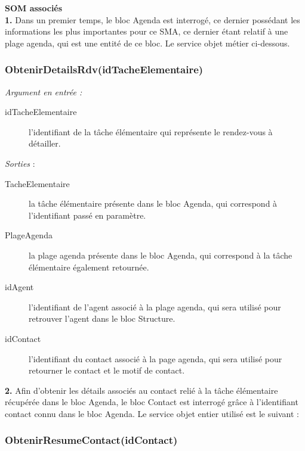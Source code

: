 \begin{shaded}
\textbf{SOM associés}\\
\textbf{1.} Dans un premier temps, le bloc Agenda est interrogé, ce dernier possédant les informations les plus importantes pour ce SMA, ce dernier étant relatif à une plage agenda, qui est une entité de ce bloc. Le service objet métier ci-dessous.
\end{shaded}


\subsubsection{ObtenirDetailsRdv(idTacheElementaire)}

\noindent \textit{Argument en entrée :}
\begin{description}
\item[idTacheElementaire] l'identifiant de la tâche élémentaire qui représente le rendez-vous à détailler. \\
\end{description}

\noindent \textit{Sorties} : 
\begin{description}
\item[TacheElementaire] la tâche élémentaire présente dans le bloc Agenda, qui correspond à l'identifiant passé en paramètre.
\item[PlageAgenda] la plage agenda présente dans le bloc Agenda, qui correspond à la tâche élémentaire également retournée.
\item[idAgent] l'identifiant de l'agent associé à la plage agenda, qui sera utilisé pour retrouver l'agent dans le bloc Structure. 
\item[idContact] l'identifiant du contact associé à la page agenda, qui sera utilisé pour retourner le contact et le motif de contact. \\
\end{description}

\begin{shaded}
\textbf{2.} Afin d'obtenir les détails associés au contact relié à la tâche élémentaire récupérée dans le bloc Agenda, le bloc Contact est interrogé grâce à l'identifiant contact connu dans le bloc Agenda. Le service objet entier utilisé est le suivant :
\end{shaded}

\subsubsection{ObtenirResumeContact(idContact)}

